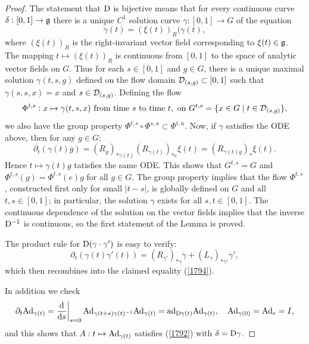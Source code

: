 \begin{proof}
    The statement that $\mathrm{D}$ is bijective means that for every continuous curve $\delta:[0,1]\to\mathfrak{g}$ there is a unique $C^1$ solution curve $\gamma:[0,1]\to G$ of the equation
    \[\dot\gamma(t)=(\xi(t))_R(\gamma(t),\]
    where $(\xi(t))_R$ is the right-invariant vector field corresponding to $\xi(t)\in\mathfrak{g}$. The mapping $t\mapsto (\xi(t))_R$ is continuous from $[0,1]$ to the space of analytic vector fields on $G$. Thus for each $s\in[0,1]$ and $g\in G$, there is a unique maximal solution $\gamma(t,s,g)$ defined on the flow domain $\mathcal{D}_{(s,g)}\subset [0,1]$ such that $\gamma(s,s,x)=x$ and $s\in \mathcal{D}_{(s,g)}$. Defining the flow
    \[\Phi^{t,s}:x\mapsto \gamma(t,s,x)\text{ from time }s\text{ to time }t,\text{ on }G^{t,s}=\{x\in G\mid t\in \mathcal{D}_{(s,g)}\},\]
    we also have the group property $\Phi^{t,s}\circ \Phi^{s,u}\subset \Phi^{t,u}$. Now, if $\gamma$ satisfies the ODE above, then for any $g\in G$:
    \[\partial_t(\gamma(t)g)=\left(R_{g}\right)_{\ast \gamma(t)} \left(R_{\gamma(t)}\right)_{\ast e}\xi(t)=\left(R_{\gamma(t)g}\right)_{\ast}\xi(t).\]
    Hence $t\mapsto \gamma(t)g$ tatisfies the same ODE. This shows that $G^{t,s}=G$ and $\Phi^{t,s}(g)=\Phi^{t,s}(e)g$ for all $g\in G$. The group property implies that the flow $\Phi^{t,s}$, constructed first only for small $|t-s|$, is globally defined on $G$ and all $t,s\in[0,1]$; in particular, the solution $\gamma$ exists for all $s,t\in [0,1]$. The continuous dependence of the solution on the vector fields implies that the inverse $\mathrm{D}^{-1}$ is continuous, so the first statement of the Lemma is proved.

    The product rule for $\mathrm{D}(\gamma\cdot\gamma')$ is easy to verify:
    \[\partial_t(\gamma(t)\gamma'(t))=\left(R_{\gamma'}\right)_{\ast \gamma}\dot\gamma+ \left(L_{\gamma}\right)_{\ast \gamma'}\dot\gamma',\]
    which then recombines into the claimed equality (\ref{1794}).

    In addition we check 
    \[\partial_t \Ad_{\gamma(t)}=\restr{\frac{\dd}{\dd s}}{s=0}\Ad_{\gamma(t+s)\gamma(t)^{-1}}\Ad_{\gamma(t)}=\ad_{\rmD \gamma(t)}\Ad_{\gamma(t)},\quad \Ad_{\gamma(0)}=\Ad_e=I,\]
    and this shows that $A:t\mapsto \mathrm{Ad}_{\gamma(t)}$ satisfies (\ref{1792}) with $\delta=\mathrm{D}\gamma$.


\end{proof}
